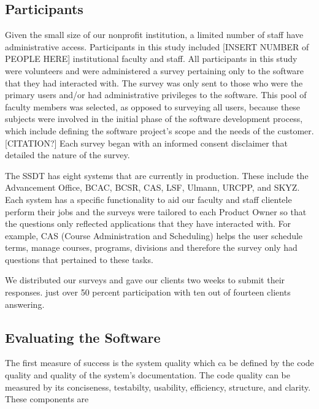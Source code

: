 \subsection{Participants}
Given the small size of our nonprofit institution, a limited number of staff have administrative access. Participants in this study included [INSERT NUMBER of PEOPLE HERE] institutional faculty and staff. All participants in this study were volunteers and were administered a survey pertaining only to the software that they had interacted with. The survey was only sent to those who were the primary users and/or had administrative privileges to the software. This pool of faculty members was selected, as opposed to surveying all users, because these subjects were involved in the initial phase of the software development process, which include defining the software project’s scope and the needs of the customer. [CITATION?] Each survey began with an informed consent disclaimer that detailed the nature of the survey.

The SSDT has eight systems that are currently in production. These include the Advancement Office, BCAC, BCSR, CAS, LSF, Ulmann, URCPP, and SKYZ. Each system has a specific functionality to aid our faculty and staff clientele perform their jobs and the surveys were tailored to each Product Owner so that the questions only reflected applications that they have interacted with. For example, CAS (Course Administration and Scheduling) helps the user schedule terms, manage courses, programs, divisions and therefore the survey only had questions that pertained to these tasks.

We distributed our surveys and gave our clients two weeks to submit their responses. just over 50 percent participation with ten out of fourteen clients answering.

\subsection{Evaluating the Software}
 The first measure of success is the system quality which ca be defined by the code quality and quality of the system's documentation. The code quality can be measured by its conciseness, testabilty, usability, efficiency, structure, and clarity. These components are

